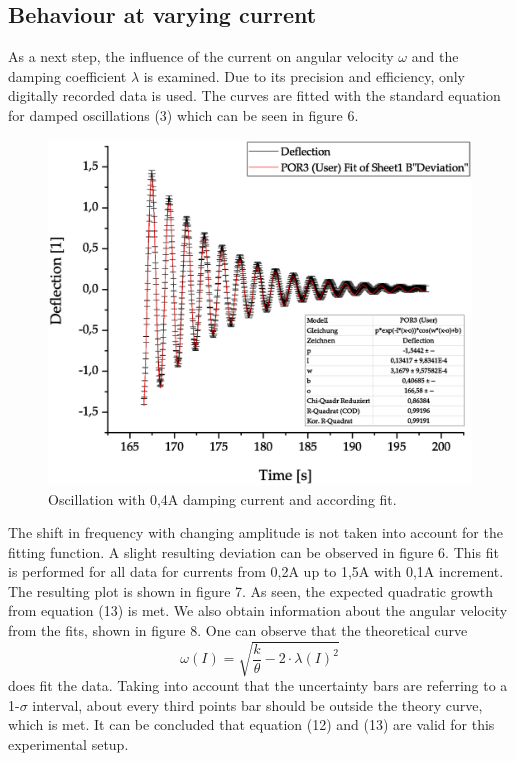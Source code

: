 \documentclass{article}
\begin{document}
\subsection{Behaviour at varying current}
As a next step, the influence of the current on angular velocity $\omega$ and the damping coefficient $\lambda$ is examined.
Due to its precision and efficiency, only digitally recorded data is used. The curves are fitted with the standard equation for damped oscillations (3) which can be seen in figure 6.
\nopagebreak
\begin{figure}[H]
\centering
\includegraphics[width=350pt]{0-4A.eps}
\caption{Oscillation with 0,4A damping current and according fit.}
\label{fig:length_eight_mouse}
\end{figure}
\nopagebreak
\noindent
The shift in frequency with changing amplitude is not taken into account for the fitting function. A slight resulting deviation can be observed in figure 6. This fit is performed for all data for currents from 0,2A up to 1,5A with 0,1A increment. The resulting plot is shown in figure 7.
As seen, the expected quadratic growth from equation (13) is met.
We also obtain information about the angular velocity from the fits, shown in figure 8.
One can observe that the theoretical curve
\begin{equation}
\omega(I) = \sqrt{\frac{k}{\theta}-2\cdot\lambda(I)^2}
\end{equation}
does fit the data. Taking into account that the uncertainty bars are referring to a 1-$\sigma$ interval, about every third points bar should be outside the theory curve, which is met.
It can be concluded that equation (12) and (13) are valid for this experimental setup.
\end{document}

